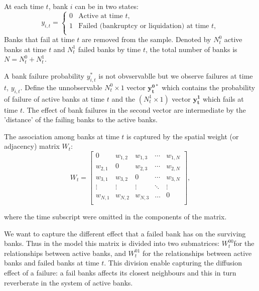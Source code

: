 \documentclass[11pt,final]{article}%
\newcommand{\vect}[1]{\bm{#1}}
\begin{document}
At each time $t$, bank $i$ can be in two states:
\begin{equation}
y_{i, t} =
\begin{cases}
	0 &	\text{Active at time }t, \\
    1 &	\text{Failed (bankruptcy or liquidation) at time }t, \\
\end{cases}
\end{equation}
Banks that fail at time $t$ are removed from the sample.  Denoted by $N^{0}_{t}$ active banks at time $t$ and $N^{1}_{t}$ failed banks by time $t$, the total number of banks is $N = N^{0}_{t} + N^{1}_{t}$.


A bank failure probability $y^{*}_{i,t}$ is not obvservablle but we observe failures at time $t$,  $y_{i,t}$. Define the unnobservable $N_{t}^{0} \times 1$ vector $\vect{y^{0*}_{t}}$ which contains the probability of failure of active banks at time $t$ and the $(N_{t}^{1} \times 1)$ vector $\vect{y_{t}^{1}}$ which fails at time $t$. The effect of bank failures in the second vector are intermediate by the 'distance' of the failing banks to the active banks.

The association among banks at time $t$  is captured by the spatial weight (or adjacency) matrix $W_{t}$:
\begin{equation}
W_{t} = 
\begin{bmatrix}
	0			&	w_{1, 2}	&	w_{1,3}		&	\cdots	&	w_{1, N}	\\
    w_{2,1}	&	0				&	w_{2,3}				&	\cdots	&	w_{2, N}	\\
    w_{3,1}	&	w_{3, 2}	&	0				&	\cdots	&	w_{3, N}	\\
    \vdots 	& \vdots		&	\vdots		&	\ddots	&	\vdots	\\
    w_{N,1}	&	w_{N, 2}	&	w_{N,3}		&	\dots	&	0	\\
\end{bmatrix},
\end{equation}

where the time subscript were omitted in the components of the matrix. 

We want to capture the different effect that a failed bank has on the surviving banks. Thus in the model this matrix is divided into two submatrices: $W^{00}_{t}$for the relationships between active banks, and $W^{01}_{t}$ for the relationships between active banks and failed banks at time $t$. This division enable capturing the diffusion  effect of a failure: a fail banks affects its closest neighbours and this in turn reverberate in the system of active banks. 
\end{document}
